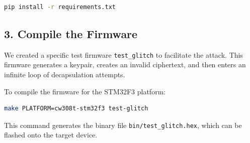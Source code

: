 \begin{lstlisting}[language=bash]
pip install -r requirements.txt
\end{lstlisting}

\subsection{3. Compile the Firmware}
We created a specific test firmware \texttt{test\_glitch} to facilitate the attack. This firmware generates a keypair, creates an invalid ciphertext, and then enters an infinite loop of decapsulation attempts.

To compile the firmware for the STM32F3 platform:

\begin{lstlisting}[language=bash]
make PLATFORM=cw308t-stm32f3 test-glitch
\end{lstlisting}

This command generates the binary file \texttt{bin/test\_glitch.hex}, which can be flashed onto the target device.
